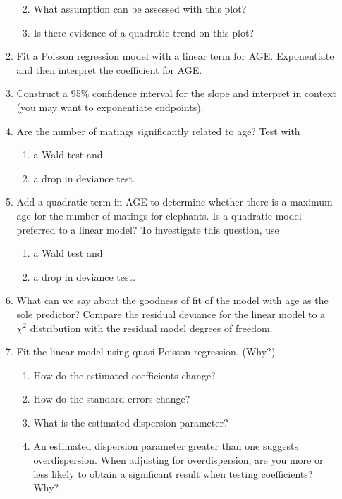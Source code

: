 \documentclass[
]{krantz}
\providecommand{\tightlist}{%
  \setlength{\itemsep}{0pt}\setlength{\parskip}{0pt}}
\begin{document}
\begin{enumerate}
\begin{enumerate}
    \begin{enumerate}
    \def\labelenumiii{\roman{enumiii}.}
    \tightlist
    \item
      What assumption can be assessed with this plot?
    \item
      Is there evidence of a quadratic trend on this plot?
    \end{enumerate}
  \item
    Fit a Poisson regression model with a linear term for AGE. Exponentiate and then interpret the coefficient for AGE.
  \item
    Construct a 95\% confidence interval for the slope and interpret in context (you may want to exponentiate endpoints).
  \item
    Are the number of matings significantly related to age? Test with

    \begin{enumerate}
    \def\labelenumiii{\roman{enumiii}.}
    \tightlist
    \item
      a Wald test and
    \item
      a drop in deviance test.
    \end{enumerate}
  \item
    Add a quadratic term in AGE to determine whether there is a maximum age for the number of matings for elephants. Is a quadratic model preferred to a linear model? To investigate this question, use

    \begin{enumerate}
    \def\labelenumiii{\roman{enumiii}.}
    \tightlist
    \item
      a Wald test and
    \item
      a drop in deviance test.
    \end{enumerate}
  \item
    What can we say about the goodness of fit of the model with age as the sole predictor? Compare the residual deviance for the linear model to a \(\chi^2\) distribution with the residual model degrees of freedom.
  \item
    Fit the linear model using quasi-Poisson regression. (Why?)

    \begin{enumerate}
    \def\labelenumiii{\roman{enumiii}.}
    \tightlist
    \item
      How do the estimated coefficients change?
    \item
      How do the standard errors change?
    \item
      What is the estimated dispersion parameter?
    \item
      An estimated dispersion parameter greater than one suggests overdispersion. When adjusting for overdispersion, are you more or less likely to obtain a significant result when testing coefficients? Why?
    \end{enumerate}
  \end{enumerate}
\end{enumerate}
\end{document}
